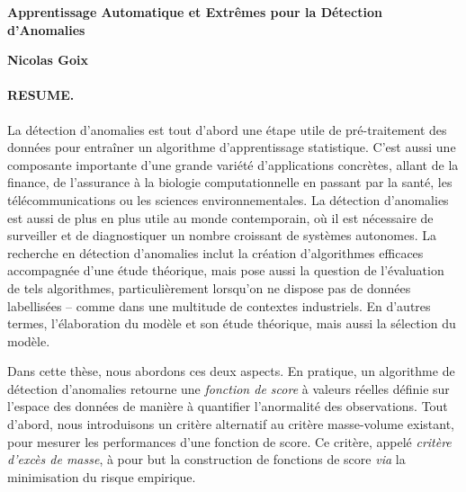 \documentclass[a4paper, 8pt]{article}
\begin{document}
\begin{center}
{\large \textbf{Apprentissage Automatique et Extrêmes pour la Détection d'Anomalies\\}}
\vspace{0.5em}

\textbf{Nicolas Goix}
\end{center}



\paragraph{RESUME.}

La détection d'anomalies est tout d'abord une étape utile de pré-traitement des données pour entraîner un algorithme d'apprentissage statistique. C'est aussi une composante importante d'une grande variété d'applications concrètes, allant de la finance, de l'assurance à la biologie computationnelle en passant par la santé, les télécommunications ou les sciences environnementales. La détection d'anomalies est aussi de plus en plus utile au monde contemporain, où il est nécessaire de surveiller et de diagnostiquer un nombre croissant de systèmes autonomes. La recherche en détection d'anomalies inclut la création d'algorithmes efficaces accompagnée d'une étude théorique, mais pose aussi la question de l'évaluation de tels algorithmes, particulièrement lorsqu'on ne dispose pas de données labellisées -- comme dans une multitude de contextes industriels.
%
En d'autres termes, l'élaboration du modèle et son étude théorique, mais aussi la sélection du modèle.
%

Dans cette thèse, nous abordons ces deux aspects. En pratique, un algorithme de détection d'anomalies retourne une \emph{fonction de score} à valeurs réelles définie sur l'espace des données de manière à quantifier l'anormalité des observations.
%
Tout d'abord, nous introduisons un critère alternatif au critère masse-volume existant, pour mesurer les performances d'une fonction de score.
%
Ce critère, appelé \emph{critère d'excès de masse}, à pour but la construction de fonctions de score \emph{via} la minimisation du risque empirique.
\end{document}

